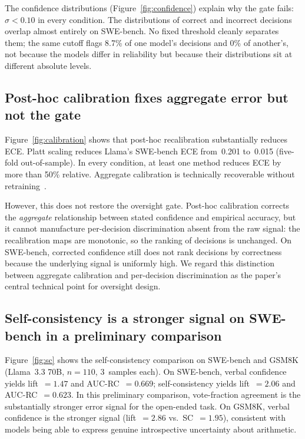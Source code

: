 \documentclass[10pt,twocolumn]{article}
\begin{document}
The confidence distributions (Figure~\ref{fig:confidence}) explain why the gate
fails: $\sigma{<}0.10$ in every condition. The distributions of correct and
incorrect decisions overlap almost entirely on SWE-bench. No fixed threshold
cleanly separates them; the same cutoff flags 8.7\% of one model's decisions
and 0\% of another's, not because the models differ in reliability but because
their distributions sit at different absolute levels.

\subsection{Post-hoc calibration fixes aggregate error but not the gate}

Figure~\ref{fig:calibration} shows that post-hoc recalibration substantially
reduces ECE. Platt scaling reduces Llama's SWE-bench ECE from~0.201 to~0.015
(five-fold out-of-sample). In every condition, at least one method reduces ECE
by more than 50\% relative. Aggregate calibration is technically recoverable
without retraining~\citep{guo2017,tian2023}.

However, this does not restore the oversight gate. Post-hoc calibration corrects
the \emph{aggregate} relationship between stated confidence and empirical
accuracy, but it cannot manufacture per-decision discrimination absent from the
raw signal: the recalibration maps are monotonic, so the ranking of decisions
is unchanged. On SWE-bench, corrected confidence still does not rank decisions
by correctness because the underlying signal is uniformly high. We regard this
distinction between aggregate calibration and per-decision discrimination as
the paper's central technical point for oversight design.

\subsection{Self-consistency is a stronger signal on SWE-bench in a
preliminary comparison}

Figure~\ref{fig:sc} shows the self-consistency comparison on SWE-bench and
GSM8K (Llama~3.3 70B, $n{=}110$, 3~samples each). On SWE-bench, verbal
confidence yields lift~$=1.47$ and AUC-RC~$=0.669$; self-consistency yields
lift~$=2.06$ and AUC-RC~$=0.623$. In this preliminary comparison,
vote-fraction agreement is the substantially stronger error signal for the
open-ended task. On GSM8K, verbal confidence is
the stronger signal (lift~$=2.86$ vs.\ SC~$=1.95$), consistent with models
being able to express genuine introspective uncertainty about arithmetic.
\end{document}

